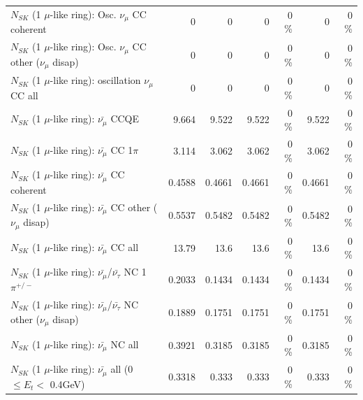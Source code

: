 \begin{table}
\begin{tabular}{| l | r | r | r  r | r  r |}
                        $N_{SK}$ (1 $\mu$-like ring): Osc. $\nu_\mu$ CC coherent &               0 &               0 &               0 &        0 \%  &               0 &        0 \%  \\ 
         $N_{SK}$ (1 $\mu$-like ring): Osc. $\nu_\mu$ CC other ($\nu_\mu$ disap) &               0 &               0 &               0 &        0 \%  &               0 &        0 \%  \\ 
                      $N_{SK}$ (1 $\mu$-like ring): oscillation $\nu_\mu$ CC all &               0 &               0 &               0 &        0 \%  &               0 &        0 \%  \\ 
\hline
\hline
                              $N_{SK}$ (1 $\mu$-like ring): $\bar{\nu_\mu}$ CCQE &           9.664 &           9.522 &           9.522 &        0 \%  &           9.522 &        0 \%  \\ 
                         $N_{SK}$ (1 $\mu$-like ring): $\bar{\nu_\mu}$ CC 1$\pi$ &           3.114 &           3.062 &           3.062 &        0 \%  &           3.062 &        0 \%  \\ 
                       $N_{SK}$ (1 $\mu$-like ring): $\bar{\nu_\mu}$ CC coherent &          0.4588 &          0.4661 &          0.4661 &        0 \%  &          0.4661 &        0 \%  \\ 
        $N_{SK}$ (1 $\mu$-like ring): $\bar{\nu_\mu}$ CC other ($\nu_\mu$ disap) &          0.5537 &          0.5482 &          0.5482 &        0 \%  &          0.5482 &        0 \%  \\ 
                          $N_{SK}$ (1 $\mu$-like ring): $\bar{\nu_{\mu}}$ CC all &           13.79 &            13.6 &            13.6 &        0 \%  &            13.6 &        0 \%  \\ 
\hline
  $N_{SK}$ (1 $\mu$-like ring): $\bar{\nu_\mu}$/$\bar{\nu_\tau}$ NC 1$\pi^{+/-}$ &          0.2033 &          0.1434 &          0.1434 &        0 \%  &          0.1434 &        0 \%  \\ 
$N_{SK}$ (1 $\mu$-like ring): $\bar{\nu_\mu}$/$\bar{\nu_\tau}$ NC other ($\nu_\mu$ disap) &          0.1889 &          0.1751 &          0.1751 &        0 \%  &          0.1751 &        0 \%  \\ 
                          $N_{SK}$ (1 $\mu$-like ring): $\bar{\nu_{\mu}}$ NC all &          0.3921 &          0.3185 &          0.3185 &        0 \%  &          0.3185 &        0 \%  \\ 
\hline
   $N_{SK}$ (1 $\mu$-like ring): $\bar{\nu_{\mu}}$ all (0 $\leq E_{t} <$ 0.4GeV) &          0.3318 &           0.333 &           0.333 &        0 \%  &           0.333 &        0 \%  \\ 

\end{tabular}
\end{table}
